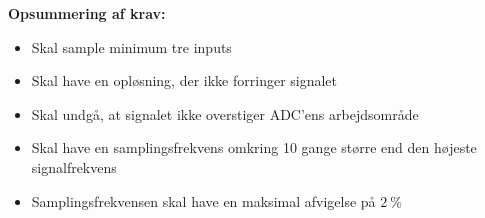 \vspace{3mm}
\textbf{Opsummering af krav:}
\begin{itemize}
\item[\text{\sffamily \checkmark}] Skal sample minimum tre inputs 
\item[\text{\sffamily \checkmark}] Skal have en opløsning, der ikke forringer signalet
\item[\text{\sffamily \checkmark}] Skal undgå, at signalet ikke overstiger ADC'ens arbejdsområde
\item[\text{\sffamily \checkmark}] Skal have en samplingsfrekvens omkring 10 gange større end den højeste signalfrekvens
\item[\text{\sffamily \checkmark}] Samplingsfrekvensen skal have en maksimal afvigelse på $2~\%$
\end{itemize}

